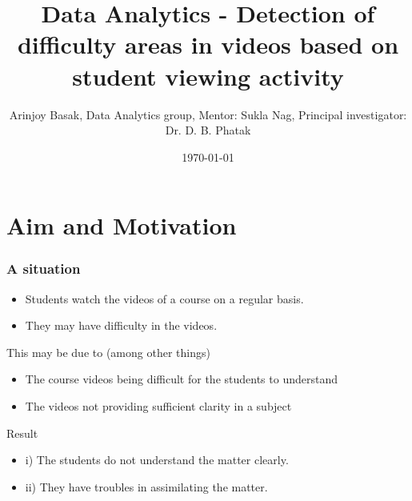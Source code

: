\documentclass[12pt,xcolor=dvipsnames]{beamer}
\title{Data Analytics - Detection of difficulty areas in videos based on student viewing activity}
\author{Arinjoy Basak, Data Analytics group, Mentor: Sukla Nag, Principal investigator: Dr. D. B. Phatak}
\date{\today}
\begin{document}
\begin{frame}
\titlepage
\end{frame}




\section{Aim and Motivation}
\begin{frame}[t]
\frametitle{A situation}

\begin{itemize}
\item Students watch the videos of a course on a regular basis.
\item They may have difficulty in the videos.
\end{itemize}
This may be due to (among other things)
\begin{itemize}
\item The course videos being difficult for the students to understand
\item The videos not providing sufficient clarity in a subject
\end{itemize}
Result 	
\begin{itemize}
\item i) 	The students do not understand the matter clearly.
\item ii)	They have troubles in assimilating the matter.
\end{itemize}



\end{frame}


\end{document}
